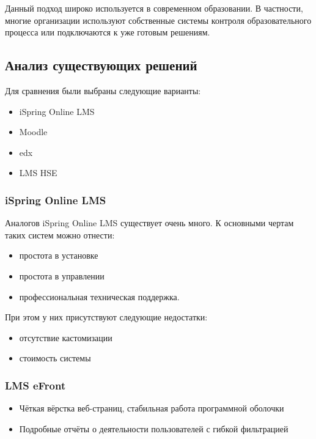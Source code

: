 \documentclass[a4paper,14pt]{article}
\begin{document}
Данный подход широко используется в современном образовании. В частности, многие организации используют собственные системы контроля образовательного процесса или подключаются к уже готовым решениям.

\subsection{Анализ существующих решений}


Для сравнения были выбраны следующие варианты:

\begin{itemize}
	\item iSpring Online LMS
	\item Moodle	
	\item edx
	\item LMS HSE
	
\end{itemize}

\subsubsection{iSpring Online LMS}

Аналогов iSpring Online LMS существует очень много.
К основными чертам таких систем можно отнести:
\begin{itemize}
	\item простота в установке
	\item простота в управлении	
	\item профессиональная техническая поддержка.
\end{itemize}

При этом у них присутствуют следующие недостатки:
\begin{itemize}
	\item отсутствие кастомизации
	\item стоимость системы
\end{itemize} 

\subsubsection{LMS eFront }

\begin{itemize}
	\item Чёткая вёрстка веб-страниц, стабильная работа программной оболочки 
	\item Подробные отчёты о деятельности пользователей с гибкой фильтрацией	

\end{itemize} 
\end{document}
